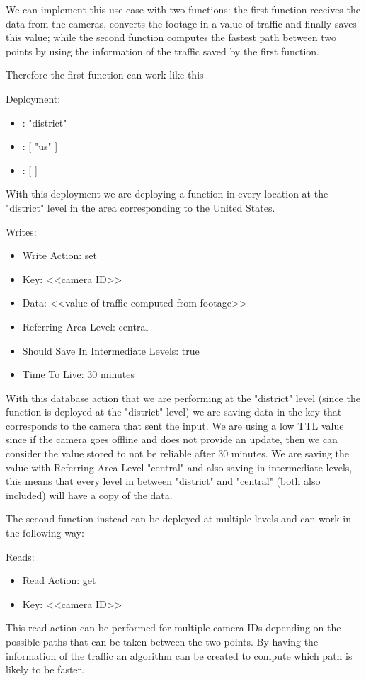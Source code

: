 We can implement this use case with two functions: the first function receives the data from the cameras, converts the footage in a value of traffic and finally saves this value; while the second function computes the fastest path between two points by using the information of the traffic saved by the first function.

Therefore the first function can work like this
\begin{example}
Deployment:
\begin{itemize}
    \item {}: "district"
    \item {}: [ "us" ]
    \item {}: [ ]
\end{itemize}
With this deployment we are deploying a function in every location at the "district" level in the area corresponding to the United States.

Writes:
\begin{itemize}
    \item Write Action: set
    \item Key: <<camera ID>>
    \item Data: <<value of traffic computed from footage>>
    \item Referring Area Level: central
    \item Should Save In Intermediate Levels: true
    \item Time To Live: 30 minutes
\end{itemize}
With this database action that we are performing at the "district" level (since the function is deployed at the "district" level) we are saving data in the key that corresponds to the camera that sent the input. We are using a low TTL value since if the camera goes offline and does not provide an update, then we can consider the value stored to not be reliable after 30 minutes.
We are saving the value with Referring Area Level "central" and also saving in intermediate levels, this means that every level in between "district" and "central" (both also included) will have a copy of the data.
\end{example}

The second function instead can be deployed at multiple levels and can work in the following way:
\begin{example}
Reads:
\begin{itemize}
    \item Read Action: get
    \item Key: <<camera ID>>
\end{itemize}
This read action can be performed for multiple camera IDs depending on the possible paths that can be taken between the two points.
By having the information of the traffic an algorithm can be created to compute which path is likely to be faster. 
\end{example}


